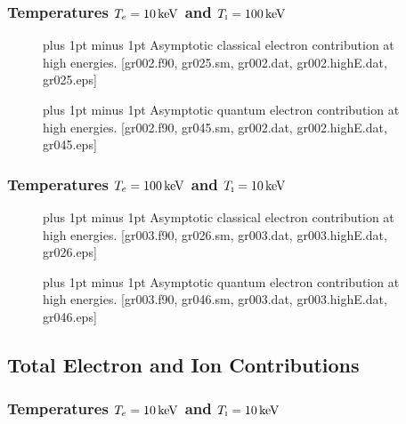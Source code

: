 \documentclass[preprint,12pt,eqsecnum,nofootinbib,amsmath,amssymb]{revtex4}
\newcommand{\smI}{{\rm\scriptscriptstyle I}}
\newcommand{\footnoteskip}{\baselineskip 12pt plus 1pt minus 1pt}
\begin{document}
\subsubsection{Temperatures $T_e=10\,{\rm keV}$ and $T_\smI=100\,{\rm keV}$}

\begin{figure}[h!]
\caption{\footnoteskip  
  Asymptotic classical electron contribution at high
  energies. [gr002.f90, gr025.sm, gr002.dat, 
  gr002.highE.dat, gr025.eps]
}
\label{fig:gr025}
\end{figure}

\begin{figure}[h!]
\vskip-0.8cm 
\caption{\footnoteskip  
  Asymptotic quantum electron contribution at high
  energies. [gr002.f90, gr045.sm, gr002.dat, gr002.highE.dat,
  gr045.eps]
}
\label{fig:gr045}
\end{figure}


\subsubsection{Temperatures $T_e=100\,{\rm keV}$ and $T_\smI=10\,{\rm keV}$}

\begin{figure}[h!]
\caption{\footnoteskip  
  Asymptotic classical electron contribution at high
  energies. [gr003.f90, gr026.sm, gr003.dat, 
  gr003.highE.dat, gr026.eps]
}
\label{fig:gr026}
\end{figure}

\begin{figure}[h!]
\vskip-0.8cm 
\caption{\footnoteskip  
  Asymptotic quantum electron contribution at high
  energies. [gr003.f90, gr046.sm, gr003.dat, gr003.highE.dat,
  gr046.eps]
}
\label{fig:gr046}
\end{figure}


\pagebreak
\subsection{Total Electron and Ion Contributions}

\subsubsection{Temperatures $T_e=10\,{\rm keV}$ and $T_\smI=10\,{\rm keV}$}
\end{document}
